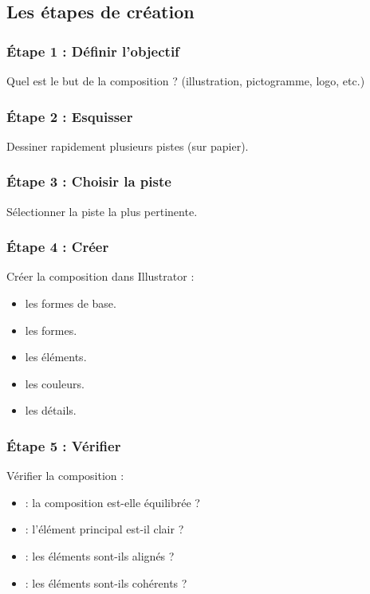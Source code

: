 \subsection{Les étapes de création}

\subsubsection{Étape 1 : Définir l'objectif}

Quel est le but de la composition ? (illustration, pictogramme, logo, etc.)

\subsubsection{Étape 2 : Esquisser}

Dessiner rapidement plusieurs pistes (sur papier).

\subsubsection{Étape 3 : Choisir la piste}

Sélectionner la piste la plus pertinente.

\subsubsection{Étape 4 : Créer}

Créer la composition dans Illustrator :

\begin{itemize}
    \item {} les formes de base.
    \item {} les formes.
    \item {} les éléments.
    \item {} les couleurs.
    \item {} les détails.
\end{itemize}

\subsubsection{Étape 5 : Vérifier}

Vérifier la composition :

\begin{itemize}
    \item {} : la composition est-elle équilibrée ?
    \item {} : l'élément principal est-il clair ?
    \item {} : les éléments sont-ils alignés ?
    \item {} : les éléments sont-ils cohérents ?
\end{itemize}

